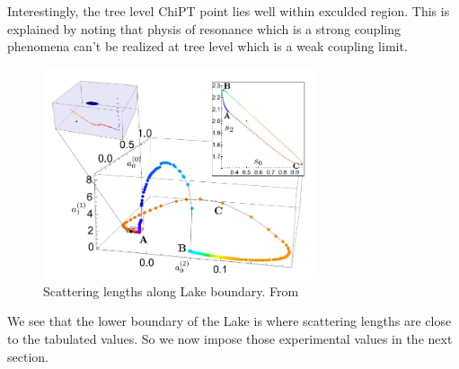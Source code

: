 ﻿\documentclass[12pt,a4paper]{article}
\begin{document}
Interestingly, the tree level ChiPT point lies well within exculded region. This is explained by noting that physis of resonance which is a strong coupling phenomena can't be realized at tree level which is a weak coupling limit.
\begin{figure}[H]
  \centering
  \includegraphics[width=8cm]{5.jpg}
  \caption{Scattering lengths along Lake boundary. From \cite{2}}
  \label{fig:1}
\end{figure}
We see that the lower boundary of the Lake is where scattering lengths are close to the tabulated values. So we now impose those experimental values in the next section.
\end{document}
